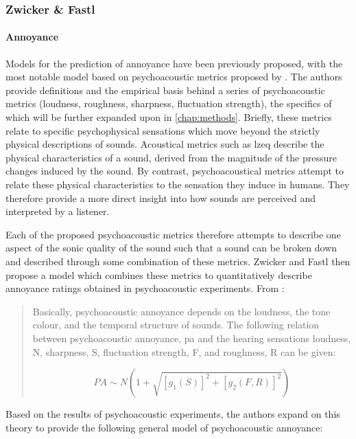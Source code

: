 \subsubsection*{Zwicker \& Fastl}

\paragraph*{Annoyance}Models for the prediction of annoyance have been previously proposed, with the most notable model based on psychoacoustic metrics proposed by \citet{PsychoacousticsfactsmodelsZwicker}. The authors provide definitions and the empirical basis behind a series of psychoacoustic metrics (loudness, roughness, sharpness, fluctuation strength), the specifics of which will be further expanded upon in \cref{chap:methods}. Briefly, these metrics relate to specific psychophysical sensations which move beyond the strictly physical descriptions of sounds. Acoustical metrics such as \gls{lzeq} describe the physical characteristics of a sound, derived from the magnitude of the pressure changes induced by the sound. By contrast, psychoacoustical metrics attempt to relate these physical characteristics to the sensation they induce in humans. They therefore provide a more direct insight into how sounds are perceived and interpreted by a listener. 

Each of the proposed psychoacoustic metrics therefore attempts to describe one aspect of the sonic quality of the sound such that a sound can be broken down and described through some combination of these metrics. Zwicker and Fastl then propose a model which combines these metrics to quantitatively describe annoyance ratings obtained in psychoacoustic experiments. From \citet[p. 327]{PsychoacousticsfactsmodelsZwicker}:

\begin{quotation}
  Basically, psychoacoustic annoyance depends on the loudness, the tone colour, and the temporal structure of sounds. The following relation between psychoacoustic annoyance, \gls{pa} and the hearing sensations loudness, N, sharpness, S, fluctuation strength, F, and roughness, R can be given:

  \begin{equation}
    \label{eqn:pa1}
    PA \sim N( 1 + \sqrt{[g_1(S)]^2 + [g_2(F, R)]^2})
  \end{equation}

\end{quotation}

Based on the results of psychoacoustic experiments, the authors expand on this theory to provide the following general model of psychoacoustic annoyance:

